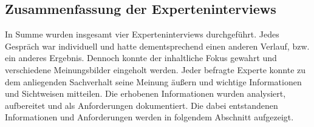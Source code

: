 \subsection{Zusammenfassung der Experteninterviews}
    In Summe wurden insgesamt vier Experteninterviews durchgeführt. Jedes Gespräch war individuell und hatte dementsprechend 
    einen anderen Verlauf, bzw. ein anderes Ergebnis. Dennoch konnte der inhaltliche Fokus gewahrt und verschiedene 
    Meinungsbilder eingeholt werden. Jeder befragte Experte konnte zu dem anliegenden Sachverhalt seine Meinung äußern und 
    wichtige Informationen und Sichtweisen mitteilen. Die erhobenen Informationen wurden analysiert, aufbereitet und 
    als Anforderungen dokumentiert. Die dabei entstandenen Informationen und Anforderungen werden in 
    folgendem Abschnitt aufgezeigt. 
    
\pagebreak
